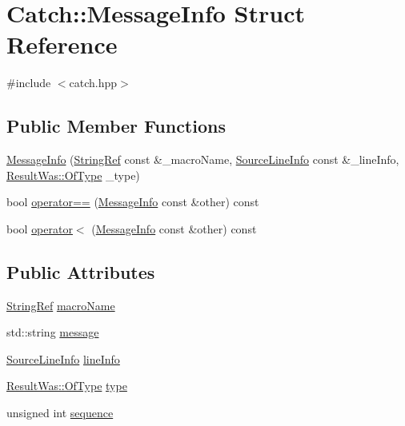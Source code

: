 \hypertarget{struct_catch_1_1_message_info}{}\section{Catch\+::Message\+Info Struct Reference}
\label{struct_catch_1_1_message_info}


{\ttfamily \#include $<$catch.\+hpp$>$}

\subsection*{Public Member Functions}
\begin{DoxyCompactItemize}
\item 
\mbox{\hyperlink{struct_catch_1_1_message_info_afac7a84a9e8655428035a3c5418044f0}{Message\+Info}} (\mbox{\hyperlink{class_catch_1_1_string_ref}{String\+Ref}} const \&\+\_\+macro\+Name, \mbox{\hyperlink{struct_catch_1_1_source_line_info}{Source\+Line\+Info}} const \&\+\_\+line\+Info, \mbox{\hyperlink{struct_catch_1_1_result_was_a624e1ee3661fcf6094ceef1f654601ef}{Result\+Was\+::\+Of\+Type}} \+\_\+type)
\item 
bool \mbox{\hyperlink{struct_catch_1_1_message_info_af4b37f2172ba55395813b4bb6bbbde1a}{operator==}} (\mbox{\hyperlink{struct_catch_1_1_message_info}{Message\+Info}} const \&other) const
\item 
bool \mbox{\hyperlink{struct_catch_1_1_message_info_a8254cb8fca2da02a29a9843cdcb79df1}{operator$<$}} (\mbox{\hyperlink{struct_catch_1_1_message_info}{Message\+Info}} const \&other) const
\end{DoxyCompactItemize}
\subsection*{Public Attributes}
\begin{DoxyCompactItemize}
\item 
\mbox{\hyperlink{class_catch_1_1_string_ref}{String\+Ref}} \mbox{\hyperlink{struct_catch_1_1_message_info_a3ee7cd41def0989d2193bad7101436a0}{macro\+Name}}
\item 
std\+::string \mbox{\hyperlink{struct_catch_1_1_message_info_ab6cd06e050bf426c6577502a5c50e256}{message}}
\item 
\mbox{\hyperlink{struct_catch_1_1_source_line_info}{Source\+Line\+Info}} \mbox{\hyperlink{struct_catch_1_1_message_info_a985165328723e599696ebd8e43195cc5}{line\+Info}}
\item 
\mbox{\hyperlink{struct_catch_1_1_result_was_a624e1ee3661fcf6094ceef1f654601ef}{Result\+Was\+::\+Of\+Type}} \mbox{\hyperlink{struct_catch_1_1_message_info_ae928b9117465c696e45951d9d0284e78}{type}}
\item 
unsigned int \mbox{\hyperlink{struct_catch_1_1_message_info_a7f4f57ea21e50160adefce7b68a781d6}{sequence}}
\end{DoxyCompactItemize}
